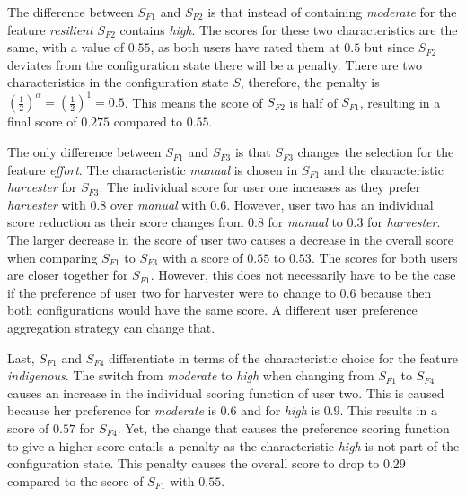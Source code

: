 The difference between  $S_{F1}$ and  $S_{F2}$ is that instead of containing \emph{moderate} for the feature \emph{resilient} $S_{F2}$ contains \emph{high}. The scores for these two characteristics are the same, with a value of $0.55$, as both users have rated them at $0.5$ but since $S_{F2}$ deviates from the configuration state there will be a penalty. There are two characteristics in the configuration state $S$, therefore, the penalty is $(\frac{1}{2})^\alpha = (\frac{1}{2})^1 = 0.5$. This means the score of $S_{F2}$ is half of $S_{F1}$, resulting in a final score of $0.275$ compared to $0.55$.

The only difference between $S_{F1}$ and $S_{F3}$ is that $S_{F3}$ changes the selection for the feature \emph{effort}. The characteristic \emph{manual} is chosen in $S_{F1}$ and the characteristic \emph{harvester} for $S_{F3}$. The individual score for user one increases as they prefer \emph{harvester} with $0.8$ over \emph{manual} with $0.6$. However, user two has an individual score reduction as their score changes from $0.8$ for \emph{manual} to $0.3$ for \emph{harvester}. The larger decrease in the score of user two causes a decrease in the overall score when comparing  $S_{F1}$ to $S_{F3}$ with a score of $0.55$ to $0.53$. The scores for both users are closer together for $S_{F1}$. However, this does not necessarily have to be the case if the preference of user two for harvester were to change to $0.6$ because then both configurations would have the same score. A different user preference aggregation strategy can change that.

Last, $S_{F1}$ and $S_{F4}$ differentiate in terms of the characteristic choice for the feature \emph{indigenous}. The switch from \emph{moderate} to \emph{high} when changing from $S_{F1}$ to $S_{F4}$ causes an increase in the individual scoring function of user two. This is caused because her preference for \emph{moderate} is $0.6$ and for \emph{high} is $0.9$. This results in a score of $0.57$ for $S_{F4}$. Yet, the change that causes the preference scoring function to give a higher score entails a penalty as the characteristic \emph{high} is not part of the configuration state. This penalty causes the overall score to drop to $0.29$ compared to the score of $S_{F1}$ with $0.55$.

 